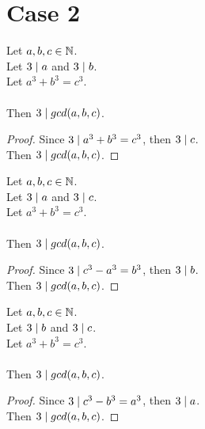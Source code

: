 \chapter{Case 2}

\begin{lemma}
    \label{lmm:three_dvd_gcd_of_dvd_a_of_dvd_b}
    \leanok
    Let $a, b, c \in \mathbb{N}$. \\
    Let $3 \mid a$ and $3 \mid b$. \\
    Let $a ^ 3 + b ^ 3 = c ^ 3$. \\\\
    Then $3 \mid gcd(a,b,c)$.
\end{lemma}
\begin{proof}
    \leanok
    Since $3 \mid a^3 + b^3 = c^3$, then $3 \mid c$. \\
    Then $3 \mid gcd(a,b,c)$.
\end{proof}

\begin{lemma}
    \label{lmm:three_dvd_gcd_of_dvd_a_of_dvd_c}
    \leanok
    Let $a, b, c \in \mathbb{N}$. \\
    Let $3 \mid a$ and $3 \mid c$. \\
    Let $a ^ 3 + b ^ 3 = c ^ 3$. \\\\
    Then $3 \mid gcd(a,b,c)$.
\end{lemma}
\begin{proof}
    \leanok
    Since $3 \mid c^3 - a^3 = b^3$, then $3 \mid b$. \\
    Then $3 \mid gcd(a,b,c)$.
\end{proof}

\begin{lemma}
    \label{lmm:three_dvd_gcd_of_dvd_b_of_dvd_c}
    \leanok
    Let $a, b, c \in \mathbb{N}$. \\
    Let $3 \mid b$ and $3 \mid c$. \\
    Let $a ^ 3 + b ^ 3 = c ^ 3$. \\\\
    Then $3 \mid gcd(a,b,c)$.
\end{lemma}
\begin{proof}
    \leanok
    Since $3 \mid c^3 - b^3 = a^3$, then $3 \mid a$. \\
    Then $3 \mid gcd(a,b,c)$.
\end{proof}

